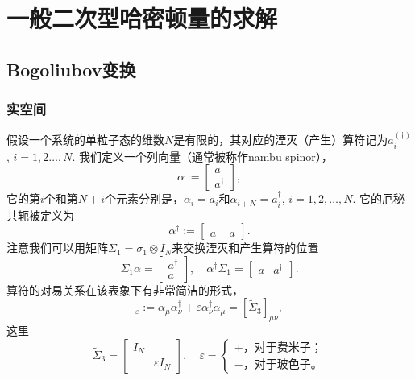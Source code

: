 
\chapter{一般二次型哈密顿量的求解}\label{ch2}

\section{Bogoliubov变换}

\subsection{实空间}
假设一个系统的单粒子态的维数$N$是有限的，其对应的湮灭（产生）算符记为$a^{(\dagger)}_i$, $i=1,2\dots,N$. 我们定义一个列向量（通常被称作nambu spinor），
\begin{equation}
  \alpha := \begin{bmatrix}
      a\\
      a^\dagger
  \end{bmatrix},
\end{equation}
它的第$i$个和第$N+i$个元素分别是，$\alpha_i=a_i$和$\alpha_{i+N}=a^\dagger_{i}$, $i=1,2,\dots,N$. 它的厄秘共轭被定义为
\begin{equation}
  \alpha^\dagger:=\begin{bmatrix}
      a^\dagger & a
  \end{bmatrix}.
\end{equation}
注意我们可以用矩阵$\Sigma_1=\sigma_1\otimes I_N$来交换湮灭和产生算符的位置
\begin{equation}
  \Sigma_1 \alpha = \begin{bmatrix}
      a^\dagger \\
      a
  \end{bmatrix},\quad \alpha^\dagger \Sigma_1 = \begin{bmatrix}
      a & a^\dagger
  \end{bmatrix}.
\end{equation}
算符的对易关系在该表象下有非常简洁的形式，
\begin{equation}
  [\alpha_\mu,\alpha^\dagger_\nu]_\varepsilon :=\alpha_\mu\alpha^\dagger_\nu +\varepsilon \alpha^\dagger_\nu \alpha_\mu=[\tilde \Sigma_3]_{\mu\nu},
\end{equation}
这里
\begin{equation}
  \tilde \Sigma_3=\begin{bmatrix}
      I_N & \\
      & \varepsilon I_N
  \end{bmatrix},\quad \varepsilon=\begin{cases}
      +\text{，对于费米子；}\\
      -\text{，对于玻色子。}
  \end{cases}
\end{equation}

